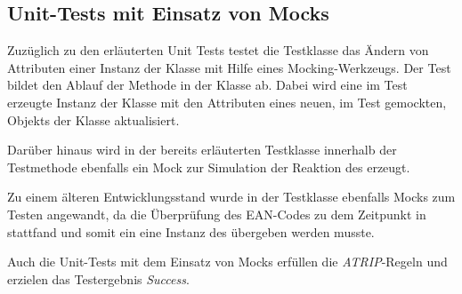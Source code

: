 \subsection*{Unit-Tests mit Einsatz von Mocks}
Zuzüglich zu den erläuterten Unit Tests testet die Testklasse \href{}{\code{}} das Ändern von Attributen einer Instanz der Klasse \href{}{\code{}} mit Hilfe eines Mocking-Werkzeugs.
Der Test bildet den Ablauf der Methode \href{}{\code{}} in der Klasse \href{}{\code{}} ab.
Dabei wird eine im Test erzeugte Instanz der Klasse \href{}{\code{}} mit den Attributen eines neuen, im Test gemockten, Objekts der Klasse \href{}{\code{}} aktualisiert.

Darüber hinaus wird in der bereits erläuterten Testklasse \href{}{} innerhalb der Testmethode \href{}{} ebenfalls ein Mock zur Simulation der Reaktion des \href{}{} erzeugt.

Zu einem älteren Entwicklungsstand wurde in der Testklasse \href{}{\code{}} ebenfalls Mocks zum Testen angewandt, da die Überprüfung des \ac{EAN}-Codes zu dem Zeitpunkt in \href{}{\code{}} stattfand und somit ein eine Instanz des \href{}{\code{}} übergeben werden musste.

Auch die Unit-Tests mit dem Einsatz von Mocks erfüllen die \textit{ATRIP}-Regeln und erzielen das Testergebnis \textit{Success}.

